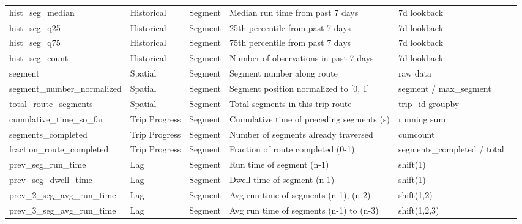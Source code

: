 \begin{table}
\begin{tabular}{llllp{5cm}l}
hist_seg_median & Historical & Segment & Median run time from past 7 days & 7d lookback \\
hist_seg_q25 & Historical & Segment & 25th percentile from past 7 days & 7d lookback \\
hist_seg_q75 & Historical & Segment & 75th percentile from past 7 days & 7d lookback \\
hist_seg_count & Historical & Segment & Number of observations in past 7 days & 7d lookback \\
segment & Spatial & Segment & Segment number along route & raw data \\
segment_number_normalized & Spatial & Segment & Segment position normalized to [0, 1] & segment / max_segment \\
total_route_segments & Spatial & Segment & Total segments in this trip route & trip_id groupby \\
cumulative_time_so_far & Trip Progress & Segment & Cumulative time of preceding segments (s) & running sum \\
segments_completed & Trip Progress & Segment & Number of segments already traversed & cumcount \\
fraction_route_completed & Trip Progress & Segment & Fraction of route completed (0-1) & segments_completed / total \\
prev_seg_run_time & Lag & Segment & Run time of segment (n-1) & shift(1) \\
prev_seg_dwell_time & Lag & Segment & Dwell time of segment (n-1) & shift(1) \\
prev_2_seg_avg_run_time & Lag & Segment & Avg run time of segments (n-1), (n-2) & shift(1,2) \\
prev_3_seg_avg_run_time & Lag & Segment & Avg run time of segments (n-1) to (n-3) & shift(1,2,3) \\
\bottomrule
\end{tabular}
\end{table}



